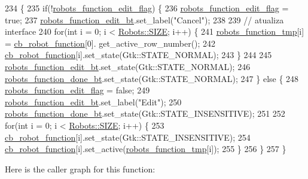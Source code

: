 \begin{DoxyCode}
234                                                             \{
235     \textcolor{keywordflow}{if}(!\hyperlink{class_robot_g_u_i_afac83e97ea43120de2433cbe27413581}{robots\_function\_edit\_flag}) \{
236         \hyperlink{class_robot_g_u_i_afac83e97ea43120de2433cbe27413581}{robots\_function\_edit\_flag} = \textcolor{keyword}{true};
237         \hyperlink{class_robot_g_u_i_ac474c7d61bd07aaf26f75acb691e2971}{robots\_function\_edit\_bt}.set\_label(\textcolor{stringliteral}{"Cancel"});
238 
239         \textcolor{comment}{// atualiza interface}
240         \textcolor{keywordflow}{for}(\textcolor{keywordtype}{int} i = 0; i < \hyperlink{class_robots_ae9df2f1d345ad6740f0459956cdd4712}{Robots::SIZE}; i++) \{
241             \hyperlink{class_robot_g_u_i_a97cc6ff736a025294efe4e41d38164d3}{robots\_function\_tmp}[i] = \hyperlink{class_robot_g_u_i_ab1e977d6ae4bcf57e4306f017695eeeb}{cb\_robot\_function}[0].
      get\_active\_row\_number();
242             \hyperlink{class_robot_g_u_i_ab1e977d6ae4bcf57e4306f017695eeeb}{cb\_robot\_function}[i].set\_state(Gtk::STATE\_NORMAL);
243         \}
244 
245         \hyperlink{class_robot_g_u_i_ac474c7d61bd07aaf26f75acb691e2971}{robots\_function\_edit\_bt}.set\_state(Gtk::STATE\_NORMAL);
246         \hyperlink{class_robot_g_u_i_a17db9c0ad94bd601734b87c6aff3fcf0}{robots\_function\_done\_bt}.set\_state(Gtk::STATE\_NORMAL);
247     \} \textcolor{keywordflow}{else} \{
248         \hyperlink{class_robot_g_u_i_afac83e97ea43120de2433cbe27413581}{robots\_function\_edit\_flag} = \textcolor{keyword}{false};
249         \hyperlink{class_robot_g_u_i_ac474c7d61bd07aaf26f75acb691e2971}{robots\_function\_edit\_bt}.set\_label(\textcolor{stringliteral}{"Edit"});
250         \hyperlink{class_robot_g_u_i_a17db9c0ad94bd601734b87c6aff3fcf0}{robots\_function\_done\_bt}.set\_state(Gtk::STATE\_INSENSITIVE);
251 
252         \textcolor{keywordflow}{for}(\textcolor{keywordtype}{int} i = 0; i < \hyperlink{class_robots_ae9df2f1d345ad6740f0459956cdd4712}{Robots::SIZE}; i++) \{
253             \hyperlink{class_robot_g_u_i_ab1e977d6ae4bcf57e4306f017695eeeb}{cb\_robot\_function}[i].set\_state(Gtk::STATE\_INSENSITIVE);
254             \hyperlink{class_robot_g_u_i_ab1e977d6ae4bcf57e4306f017695eeeb}{cb\_robot\_function}[i].set\_active(\hyperlink{class_robot_g_u_i_a97cc6ff736a025294efe4e41d38164d3}{robots\_function\_tmp}[i]);
255         \}
256     \}
257 \}
\end{DoxyCode}
Here is the caller graph for this function\+:
\mbox{\label{class_robot_g_u_i_a92e50bc76f093abdd93e6c4eddb40a63}} 
